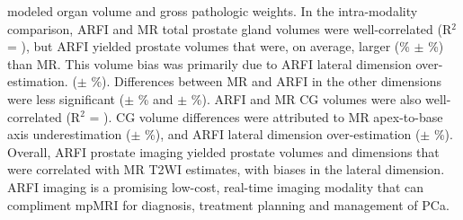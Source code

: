 modeled organ volume and gross pathologic weights.  In the intra-modality comparison,
ARFI and MR total prostate gland volumes were well-correlated (R$^2$ = \MRarfiVolTotalRsq), but
ARFI yielded prostate volumes that were, on average, larger
(\MRarfiVolTotalMeanDiff\% $\pm$ \MRarfiVolTotalStdDiff\%) than MR. This volume bias was
primarily due to ARFI lateral dimension over-estimation.
(\ARFImrTotalLatLatMeanPct $\pm$ \ARFImrTotalLatLatStdPct\%). Differences between MR and
ARFI in the other dimensions were less significant (\ARFImrTotalAntPostMeanPct $\pm$
\ARFImrTotalAntPostStdPct\% and \ARFImrTotalApexBaseMeanPct $\pm$
\ARFImrTotalApexBaseStdPct\%). ARFI and MR CG volumes were also
well-correlated (R$^2$ = \MRarfiVolCentralRsq).  CG volume differences were
attributed to MR apex-to-base axis underestimation
(\ARFImrCentralApexBaseMeanPct $\pm$ \ARFImrCentralApexBaseStdPct\%), and ARFI
lateral dimension over-estimation  (\ARFImrCentralLatLatMeanPct $\pm$
\ARFImrCentralLatLatStdPct\%).  Overall, ARFI prostate imaging yielded prostate
volumes and dimensions that were correlated with MR T2WI estimates, with biases
in the lateral dimension. ARFI imaging is a promising low-cost, real-time
imaging modality that can compliment mpMRI for diagnosis, treatment planning
and management of PCa.
